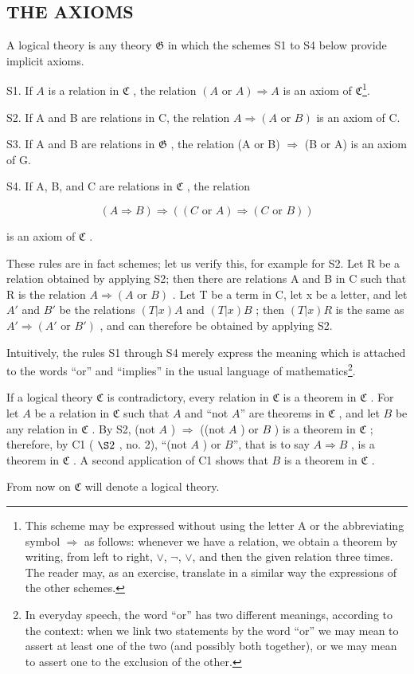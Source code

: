 \subsection{THE AXIOMS}

A logical theory is any theory \(\mathfrak{G}\) in which the schemes S1 to S4 below provide implicit axioms.

S1. If \(A\) is a relation in \(\mathfrak{C}\) , the relation \((A \text{ or } A) \Longrightarrow A\) is an axiom of \(\mathfrak{C}\)\footnote{This scheme may be expressed without using the letter A or the abbreviating symbol \(\Longrightarrow\) as follows: whenever we have a relation, we obtain a theorem by writing, from left to right, \(\vee\), \(\neg\), \(\vee\), and then the given relation three times. The reader may, as an exercise, translate in a similar way the expressions of the other schemes.}.

S2. If A and B are relations in C, the relation \(A \Longrightarrow (A \text{ or } B)\) is an axiom of C.

S3. If A and B are relations in \(\mathfrak{G}\) , the relation (A or B) \(\Longrightarrow\) (B or A) is an axiom of G.

S4. If A, B, and C are relations in \(\mathfrak{C}\) , the relation

\[
(A \Rightarrow B) \Rightarrow ((C \text {   or   } A) \Rightarrow (C \text {   or   } B))
\]

is an axiom of \(\mathfrak{C}\) .

These rules are in fact schemes; let us verify this, for example for S2. Let R be a relation obtained by applying S2; then there are relations A and B in C such that R is the relation \(A \Longrightarrow (A \text{ or } B)\) . Let T be a term in C, let x be a letter, and let \(A'\) and \(B'\) be the relations \((T|x)A\) and \((T|x)B\) ; then \((T|x)R\) is the same as \(A' \Longrightarrow (A' \text{ or } B')\) , and can therefore be obtained by applying S2.

Intuitively, the rules S1 through S4 merely express the meaning which is attached to the words ``or'' and ``implies'' in the usual language of mathematics\footnote{In everyday speech, the word ``or'' has two different meanings, according to the context: when we link two statements by the word ``or'' we may mean to assert at least one of the two (and possibly both together), or we may mean to assert one to the exclusion of the other.}.

If a logical theory \(\mathfrak{C}\) is contradictory, every relation in \(\mathfrak{C}\) is a theorem in \(\mathfrak{C}\) . For let \(A\) be a relation in \(\mathfrak{C}\) such that \(A\) and ``not \(A\)'' are theorems in \(\mathfrak{C}\) , and let \(B\) be any relation in \(\mathfrak{C}\) . By S2, (not \(A\) ) \(\Longrightarrow\) ((not \(A\) ) or \(B\) ) is a theorem in \(\mathfrak{C}\) ; therefore, by C1 ( \(\S 2\) , no. 2), ``(not \(A\) ) or \(B\)'', that is to say \(A\Longrightarrow B\) , is a theorem in \(\mathfrak{C}\) . A second application of C1 shows that \(B\) is a theorem in \(\mathfrak{C}\) .

From now on \(\mathfrak{C}\) will denote a logical theory.

